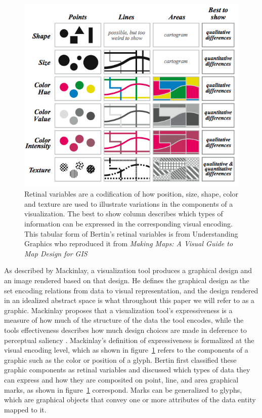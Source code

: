 \documentclass[../main.tex]{subfiles}
\begin{document}
\begin{figure}[H]
\includegraphics[width=1\textwidth]{figures/intro/retinal_variables.png}
\caption{Retinal variables are a codification of how position, size, shape, color and texture are used to illustrate variations in the components of a visualization. The best to show column describes which types of information can be expressed in the corresponding visual encoding. This tabular form of Bertin's retinal variables is from Understanding Graphics \cite{malamedInformationDisplayTips2010} who reproduced it from \textit{Making Maps: A Visual Guide to Map Design for GIS} 
\cite{krygierMakingMapsVisual2005}}
\label{fig:intro_retinal_variables}
\end{figure}

As described by Mackinlay, a visualization tool produces a graphical design and an image rendered based on that design. He defines the graphical design as the set encoding relations from data to visual representation\cite{mackinlayAutomatingDesignGraphical1986}, and the design rendered in an idealized abstract space is what throughout this paper we will refer to as a graphic. Mackinlay  proposes that a visualization tool's expressiveness is a measure of how much of the structure of the data the tool encodes, while the tools effectiveness describes how much design choices are made in deference to perceptual saliency \cite{clevelandResearchStatisticalGraphics1987,clevelandGraphicalPerceptionTheory1984,chambersGraphicalMethodsData1983a, munznerVisualizationAnalysisDesign2014}. Mackinlay's definition of expressiveness is formalized at the visual encoding level, which as shown in figure~\ref{fig:intro_retinal_variables} refers to the components of a graphic such as the color or position of a glyph. Bertin first classified these graphic components as retinal variables and discussed which types of data they can express \cite{bertinIIPropertiesGraphic2011} and how they are composited on point, line, and area graphical marks, as shown in figure~\ref{fig:intro_retinal_variables} correspond. Marks can be generalized to glyphs, which are graphical objects that convey one or more attributes of the data entity mapped to it\cite{ware2019information, munznerVisualizationAnalysisDesign2014}. 
\end{document}
